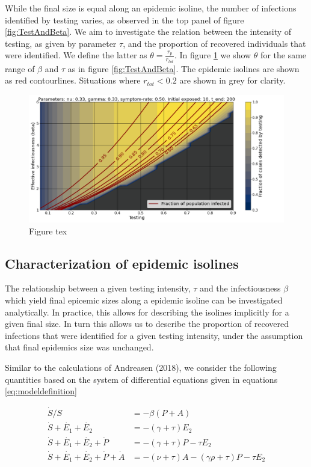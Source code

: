 \documentclass[10pt,a4paper]{article}
\begin{document}
While the final size is equal along an epidemic isoline, the number of infections identified by testing varies, as observed in the top panel of figure \ref{fig:TestAndBeta}.
We aim to investigate the relation between the intensity of testing, as given by parameter $\tau$, and the proportion of recovered individuals that were identified. 
We define the latter as $\theta = \frac{r_p}{r_{tot}}$. 
In figure \ref{fig:TestAndBetaComb} we show $\theta$ for the same range of $\beta$ and $\tau$ as in figure \ref{fig:TestAndBeta}.
The epidemic isolines are shown as red contourlines. Situations where $r_{tot} < 0.2$ are shown in grey for clarity.
\begin{figure}[h]\centering
    \includegraphics[width = \linewidth]{./../Figures/TestingModelling_TestProbAndInfectivity.png}
    \caption{Figure tex}\label{fig:TestAndBetaComb}
\end{figure}

\subsection{Characterization of epidemic isolines}
The relationship between a given testing intensity, $\tau$ and the infectiousness $\beta$ which yield final epicemic sizes along a epidemic isoline can be investigated analytically.
In practice, this allows for describing the isolines implicitly for a given final size.
In turn this allows us to describe the proportion of recovered infections that were identified for a given testing intensity, under the assumption that final epidemics size was unchanged.

Similar to the calculations of Andreasen (2018), we consider the following quantities based on the system of differential equations given in equations \eqref{eq:modeldefinition}

\begin{align}
    \dot{S} / S &= - \beta (P + A) \\
    \dot{S} + \dot{E_1} + \dot{E_2} &= -(\gamma + \tau) E_2 \\
    \dot{S} + \dot{E_1} + \dot{E_2} +\dot{P} &= -(\gamma + \tau) P - \tau E_2 \\
    \dot{S} + \dot{E_1} + \dot{E_2} + \dot{P} + \dot{A} &= -(\nu + \tau) A -(\gamma \rho + \tau) P - \tau E_2 
\end{align}
\end{document}
